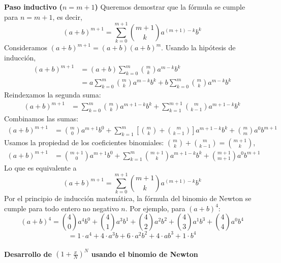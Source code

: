 \documentclass[12pt, a4paper]{article}
\theoremstyle{rioplatense}
\begin{document}
\textbf{Paso inductivo ($n = m + 1$)}
Queremos demostrar que la fórmula se cumple para $n = m + 1$, es decir,
\begin{equation*}
(a + b)^{m+1} = \sum_{k=0}^{m+1} \binom{m+1}{k} a^{(m+1)-k} b^k
\end{equation*}
Consideramos $(a + b)^{m+1} = (a + b)(a + b)^m$. Usando la hipótesis de inducción,
\begin{align*}
(a + b)^{m+1} &= (a + b) \sum_{k=0}^{m} \binom{m}{k} a^{m-k} b^k \\
&= a \sum_{k=0}^{m} \binom{m}{k} a^{m-k} b^k + b \sum_{k=0}^{m} \binom{m}{k} a^{m-k} b^k
\end{align*}
Reindexamos la segunda suma:
\begin{align*}
(a + b)^{m+1} &= \sum_{k=0}^{m} \binom{m}{k} a^{m+1-k} b^k + \sum_{k=1}^{m+1} \binom{m}{k-1} a^{m+1-k} b^k
\end{align*}
Combinamos las sumas:
\begin{align*}
(a + b)^{m+1} &= \binom{m}{0} a^{m+1} b^0 + \sum_{k=1}^{m} \left[ \binom{m}{k} + \binom{m}{k-1} \right] a^{m+1-k} b^k + \binom{m}{m} a^0 b^{m+1}
\end{align*}
Usamos la propiedad de los coeficientes binomiales: $\binom{m}{k} + \binom{m}{k-1} = \binom{m+1}{k}$,
\begin{align*}
(a + b)^{m+1} &= \binom{m+1}{0} a^{m+1} b^0 + \sum_{k=1}^{m} \binom{m+1}{k} a^{m+1-k} b^k + \binom{m+1}{m+1} a^0 b^{m+1}
\end{align*}
Lo que es equivalente a
\begin{equation*}
(a + b)^{m+1} = \sum_{k=0}^{m+1} \binom{m+1}{k} a^{(m+1)-k} b^k
\end{equation*}
Por el principio de inducción matemática, la fórmula del binomio de Newton se cumple para todo entero no negativo $n$.
Por ejemplo, para \((a + b)^4\):
\[
(a + b)^4 = \binom{4}{0}a^4b^0 + \binom{4}{1}a^3b^1 + \binom{4}{2}a^2b^2 + \binom{4}{3}a^1b^3 + \binom{4}{4}a^0b^4
\]
\[
= 1 \cdot a^4 + 4 \cdot a^3b + 6 \cdot a^2b^2 + 4 \cdot ab^3 + 1 \cdot b^4
\]


\paragraph{Desarrollo de \((1 + \frac{x}{N})^N\) usando el binomio de Newton}
\end{document}
